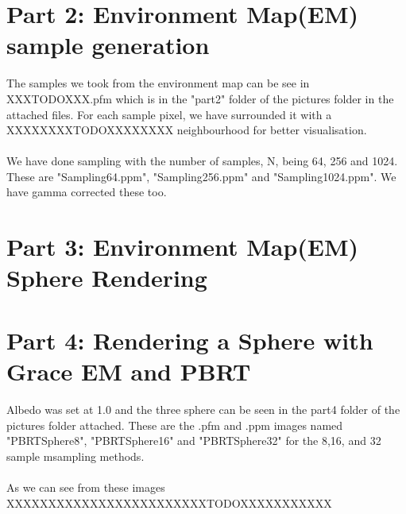 \documentclass{article}
\begin{document}
\section{Part 2: Environment Map(EM) sample generation}
The samples we took from the environment map can be see in XXXTODOXXX.pfm which
is in the "part2" folder of the pictures folder in the attached files. For 
each sample pixel, we have surrounded it with a XXXXXXXXTODOXXXXXXXX 
neighbourhood for better visualisation.\\
\\
We have done sampling with the number of samples, N, being 64, 256 and 1024.
These are "Sampling64.ppm", "Sampling256.ppm" and "Sampling1024.ppm". We have
gamma corrected these too.

\section{Part 3: Environment Map(EM) Sphere Rendering}



\section{Part 4: Rendering a Sphere with Grace EM and PBRT}
Albedo was set at 1.0 and the three sphere can be seen in the
part4 folder of the pictures folder attached. These are the
.pfm and .ppm images named "PBRTSphere8", 
"PBRTSphere16" and "PBRTSphere32" for the 8,16, and
32 sample msampling methods.\\
\\
As we can see from these images XXXXXXXXXXXXXXXXXXXXXXXXTODOXXXXXXXXXXX
\end{document}
